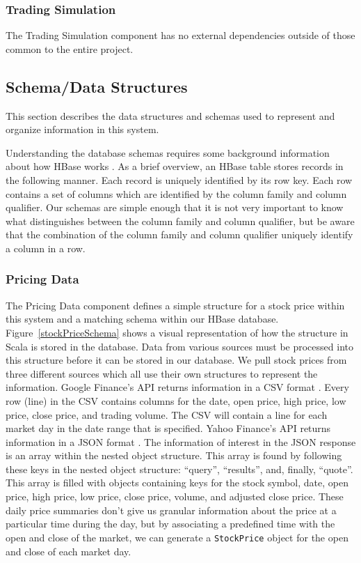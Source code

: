 \subsubsection{Trading Simulation}

The Trading Simulation component has no external dependencies outside of those common to the entire project.

\subsection{Schema/Data Structures}

This section describes the data structures and schemas used to represent and organize information in this system.

Understanding the database schemas requires some background information about how HBase works \cite{hbase}. As a brief overview, an HBase table stores records in the following manner. Each record is uniquely identified by its row key. Each row contains a set of columns which are identified by the column family and column qualifier. Our schemas are simple enough that it is not very important to know what distinguishes between the column family and column qualifier, but be aware that the combination of the column family and column qualifier uniquely identify a column in a row.

\subsubsection{Pricing Data}

The Pricing Data component defines a simple structure for a stock price within this system and a matching schema within our HBase database. Figure~\ref{stockPriceSchema} shows a visual representation of how the structure in Scala is stored in the database. Data from various sources must be processed into this structure before it can be stored in our database. We pull stock prices from three different sources which all use their own structures to represent the information. Google Finance's API returns information in a CSV format \cite{csv}. Every row (line) in the CSV contains columns for the date, open price, high price, low price, close price, and trading volume. The CSV will contain a line for each market day in the date range that is specified. Yahoo Finance's API returns information in a JSON format \cite{json}. The information of interest in the JSON response is an array within the nested object structure. This array is found by following these keys in the nested object structure: ``query'', ``results'', and, finally, ``quote''. This array is filled with objects containing keys for the stock symbol, date, open price, high price, low price, close price, volume, and adjusted close price. These daily price summaries don't give us granular information about the price at a particular time during the day, but by associating a predefined time with the open and close of the market, we can generate a \texttt{StockPrice} object for the open and close of each market day.

